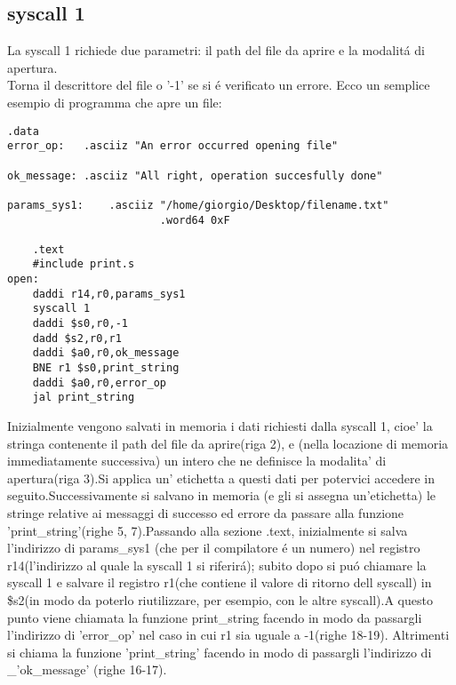 \documentclass[12pt]{report}
\begin{document}
\subsection{syscall 1}
La syscall 1 richiede due parametri: il path del file da aprire e la modalit\'{a} di apertura.\\
Torna il descrittore del file o '-1' se si \'{e} verificato un errore.
Ecco un semplice esempio di programma che apre un file:
\begin{lstlisting}[caption={syscall1}, label={code:syscall1}, style={mips}]
      	.data
error_op:	.asciiz	"An error occurred opening file"	

ok_message:	.asciiz	"All right, operation succesfully done"

params_sys1:	.asciiz	"/home/giorgio/Desktop/filename.txt"
						.word64	0xF					

	.text
	#include print.s			
open:
	daddi r14,r0,params_sys1	
	syscall 1	
	daddi $s0,r0,-1
	dadd $s2,r0,r1		
	daddi $a0,r0,ok_message	
	BNE r1 $s0,print_string	
	daddi $a0,r0,error_op		
	jal print_string			
\end{lstlisting}
Inizialmente vengono salvati in memoria i dati richiesti dalla syscall 1, cioe'
la stringa contenente il path del file da aprire(riga 2), e (nella locazione di
memoria immediatamente successiva) un intero che ne definisce la modalita' di
apertura(riga 3).Si applica un' etichetta a questi dati per potervici accedere
in seguito.Successivamente si salvano in memoria (e gli si assegna un'etichetta)
le stringe relative ai messaggi di successo ed errore da passare alla funzione
'print\_string'(righe 5, 7).Passando alla sezione .text, inizialmente si salva
l'indirizzo di params\_sys1 (che per il compilatore \'{e} un numero) nel registro
r14(l'indirizzo al quale la syscall 1 si riferir\'{a}); subito dopo si pu\'{o}
chiamare la syscall 1 e salvare il registro r1(che contiene il valore di ritorno
dell syscall) in \$s2(in modo da poterlo riutilizzare, per esempio, con le altre
syscall).A questo punto viene chiamata la funzione print\_string facendo in modo
da passargli l'indirizzo di 'error\_op' nel caso in cui r1 sia uguale a -1(righe
18-19).  Altrimenti si chiama la funzione 'print\_string' facendo in modo di
passargli l'indirizzo di \_'ok\_message' (righe 16-17).
\end{document}

